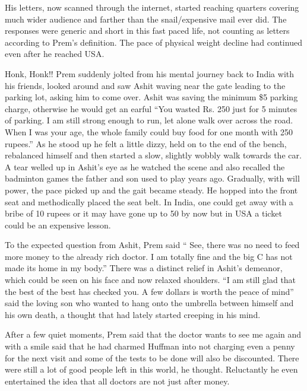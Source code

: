 His letters, now scanned through the internet, started reaching quarters
covering much wider audience and farther than the snail/expensive mail
ever did. The responses were generic and short in this fast paced life,
not counting as letters according to Prem's definition. The pace of
physical weight decline had continued even after he reached USA.

Honk, Honk!! Prem suddenly jolted from his mental journey back to India
with his friends, looked around and saw Ashit waving near the gate
leading to the parking lot, asking him to come over. Ashit was saving
the minimum \$5 parking charge, otherwise he would get an earful ``You
wasted Rs. 250 just for 5 minutes of parking. I am still strong enough
to run, let alone walk over across the road. When I was your age, the
whole family could buy food for one month with 250 rupees.'' As he stood
up he felt a little dizzy, held on to the end of the bench, rebalanced
himself and then started a slow, slightly wobbly walk towards the car. A
tear welled up in Ashit's eye as he watched the scene and also recalled
the badminton games the father and son used to play years ago.
Gradually, with will power, the pace picked up and the gait became
steady. He hopped into the front seat and methodically placed the seat
belt. In India, one could get away with a bribe of 10 rupees or it may
have gone up to 50 by now but in USA a ticket could be an expensive
lesson.

To the expected question from Ashit, Prem said `` See, there was no need
to feed more money to the already rich doctor. I am totally fine and the
big C has not made its home in my body.'' There was a distinct relief in
Ashit's demeanor, which could be seen on his face and now relaxed
shoulders. ``I am still glad that the best of the best has checked you.
A few dollars is worth the peace of mind'' said the loving son who
wanted to hang onto the umbrella between himself and his own death, a
thought that had lately started creeping in his mind.

After a few quiet moments, Prem said that the doctor wants to see me
again and with a smile said that he had charmed Huffman into not
charging even a penny for the next visit and some of the tests to be
done will also be discounted. There were still a lot of good people left
in this world, he thought. Reluctantly he even entertained the idea that
all doctors are not just after money.

